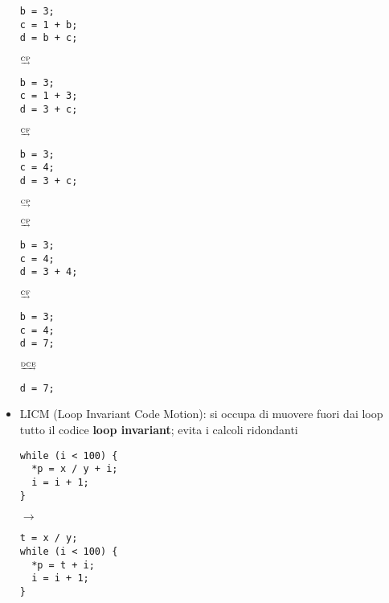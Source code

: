 \begin{itemize}
      \begin{minipage}[c]{.25\textwidth}
        \begin{lstlisting}
b = 3;
c = 1 + b;
d = b + c;\end{lstlisting}
      \end{minipage}
      \hfill $\tiny\underrightarrow{\text{CP}}$ \hfill
      \begin{minipage}[c]{.25\textwidth}
        \begin{lstlisting}
b = 3;
c = 1 + 3;
d = 3 + c;\end{lstlisting}
      \end{minipage}
      \hfill $\tiny\underrightarrow{\text{CF}}$ \hfill
      \begin{minipage}[c]{.25\textwidth}
        \begin{lstlisting}
b = 3;
c = 4;
d = 3 + c;\end{lstlisting}
      \end{minipage}
      \hfill $\tiny\underrightarrow{\text{CP}}$ \hfill

      \hfill $\tiny\underrightarrow{\text{CP}}$ \hfill
      \begin{minipage}[c]{.25\textwidth}
        \begin{lstlisting}
b = 3;
c = 4;
d = 3 + 4;\end{lstlisting}
      \end{minipage}
      \hfill $\tiny\underrightarrow{\text{CF}}$ \hfill
      \begin{minipage}[c]{.25\textwidth}
        \begin{lstlisting}
b = 3;
c = 4;
d = 7;\end{lstlisting}
      \end{minipage}
      \hfill $\tiny\underrightarrow{\text{DCE}}$ \hfill
      \begin{minipage}[c]{.25\textwidth}
        \begin{lstlisting}
d = 7;\end{lstlisting}
      \end{minipage}
    \item LICM (Loop Invariant Code Motion): si occupa di muovere fuori dai loop tutto il codice \textbf{loop invariant}; evita i calcoli ridondanti\\
      \begin{minipage}[c]{.4\textwidth}
        \begin{lstlisting}
while (i < 100) {
  *p = x / y + i;
  i = i + 1;
}\end{lstlisting}
    \end{minipage}
    \hfill $\rightarrow$ \hfill
    \begin{minipage}[c]{.4\textwidth}
      \begin{lstlisting}
t = x / y;
while (i < 100) {
  *p = t + i;
  i = i + 1;
}\end{lstlisting}
  \end{minipage}
\end{itemize}

